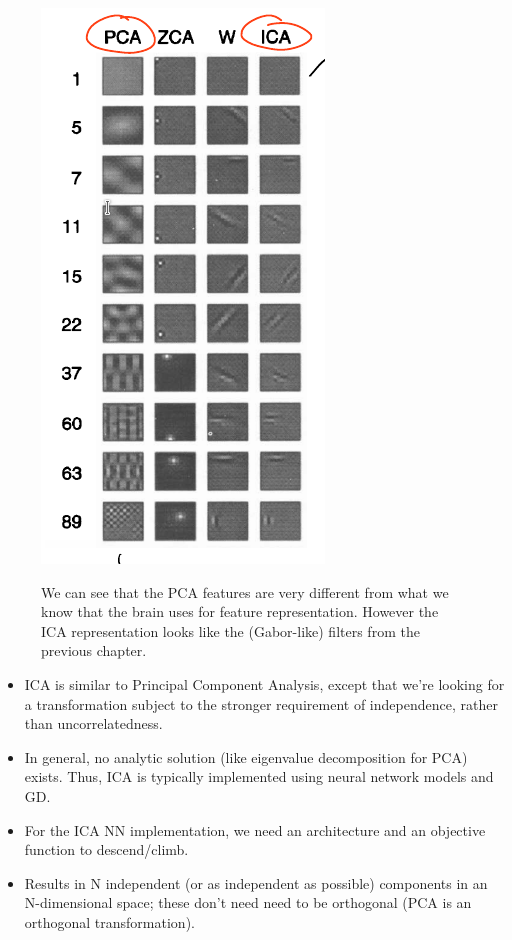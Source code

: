 \documentclass[main]{subfiles}
\begin{document}
\begin{figure}[H]
	\centering
	\includegraphics[angle=90,width=0.8\linewidth]{07_UnsupervisedAndSelfsupervisedLearning/figures/ica-filters.png}
	\label{fig:ica-filters}
	\caption{We can see that the PCA features are very different from what we know that the brain uses for feature representation. However the ICA representation looks like the (Gabor-like) filters from the previous chapter.}
\end{figure}

\begin{itemize}
    \item ICA is similar to Principal Component Analysis, except that we’re looking for a transformation subject to the stronger requirement of independence, rather than uncorrelatedness.
    \item In general, no analytic solution (like eigenvalue decomposition for PCA) exists. Thus, ICA is typically implemented using neural network models and GD.
    \item For the ICA NN implementation, we need an architecture and an objective function to descend/climb.
    \item Results in N independent (or as independent as possible) components in an N-dimensional space; these don’t need need to be orthogonal (PCA is an orthogonal transformation).
\end{itemize}
\end{document}
